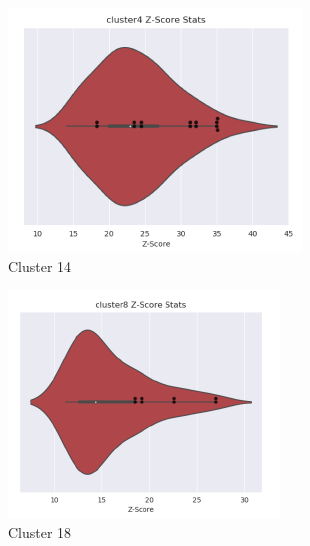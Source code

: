 \begin{figure}[htb]
\begin{subfigure}{0.2\textwidth}
  \includegraphics[width=\linewidth]{Pfam/cl14.png}
  \caption{Cluster 14}
  \label{fig:cl14}
\end{subfigure}\hfil %
\begin{subfigure}{0.2\textwidth}
  \includegraphics[width=\linewidth]{Pfam/cl18.png}
  \caption{Cluster 18}
  \label{fig:cl18}
\end{subfigure}\hfil %
\begin{subfigure}{0.2\textwidth}

\end{subfigure}
\end{figure}
